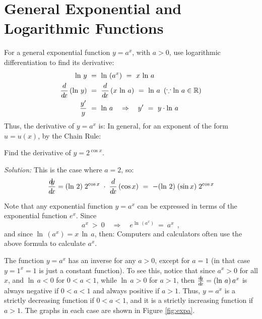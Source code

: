 \section{General Exponential and Logarithmic Functions}
For a general exponential function $y = a^x$, with $a > 0$, use logarithmic
differentiation to find its derivative:
\begin{align*}
 \ln\,y ~&=~ \ln\,\left(a^x\right) ~=~ x \,\ln\,a\\
 \frac{d}{d\!x}\,(\ln\,y) ~&=~ \frac{d}{d\!x}\,(x \,\ln\,a) ~=~ \ln\,a ~\left(\because \ln\,a \in \mathbb{R}\right)\\
 \frac{y'}{y} ~&=~ \ln\,a \quad\Rightarrow\quad y' ~=~ y \cdot \ln\,a
\end{align*}
Thus, the derivative of $y = a^x$ is:
In general, for an exponent of the form $u = u(x)$, by the Chain Rule:

\begin{exmp}
Find the derivative of $y = 2^{\cos x}$.\vspace{1mm}
\par\noindent\emph{Solution:} This is the case where $a = 2$, so:
\[
\frac{d\negmedspace y}{d\!x} = (\ln\,2)\;2^{\cos x} \;\cdot\; \frac{d}{d\!x}\,(\cos x)
~=~ -(\ln\,2)\;(\sin x)\;2^{\cos x}
\]
\end{exmp}
\divider
\vspace{3mm}

Note that any exponential function $y = a^x$ can be expressed in terms of the
exponential function $e^x$. Since
\[
a^x ~>~ 0 \quad\Rightarrow\quad e^{\ln\,(a^x)} ~=~ a^x ~~,
\]
and since $\ln\,(a^x) = x\,\ln\,a$, then:
\statecomment{\vspace{-1mm}\[ a^x ~=~ e^{x\,\ln\,a} \]}
Computers and calculators often use the above formula to calculate $a^x$.

The function $y = a^x$ has an inverse for any $a > 0$, except for $a = 1$ (in
that case $y = 1^x = 1$ is just a constant function). To see this, notice that
since $a^x > 0$ for all $x$, and $\ln\,a < 0$ for $0 < a < 1$, while
$\ln\,a > 0$ for $a > 1$, then $\frac{d\negmedspace y}{d\!x} = (\ln\,a)\,a^x$ is always negative if
$0 < a < 1$ and always positive if $a > 1$. Thus, $y = a^x$ is a
strictly decreasing function if $0 < a < 1$, and it is a strictly increasing
function if $a > 1$. The graphs in each case are shown in Figure \ref{fig:expa}.

